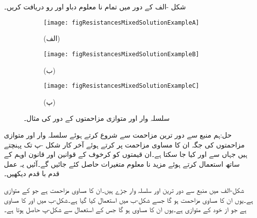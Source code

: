 شکل -الف کے دور میں تمام نا معلوم دباو اور رو دریافت کریں۔
\begin{figure}
\centering
\begin{subfigure}{\textwidth}
\centering
\texttt{[image: figResistancesMixedSolutionExampleA]}
\caption*{(الف)}
\end{subfigure}
%
\begin{subfigure}{0.6\textwidth}
\centering
\texttt{[image: figResistancesMixedSolutionExampleB]}
\caption*{(ب)}
\end{subfigure}%
\begin{subfigure}{0.4\textwidth}
\centering
\texttt{[image: figResistancesMixedSolutionExampleC]}
\caption*{(پ)}
\end{subfigure}%
\caption{سلسلہ وار اور متوازی مزاحمتوں کے دور کی مثال۔}
\label{شکل_مزاحمتی_سلسلہ_وار_متوازی_دور_حل_مثال_الف}
\end{figure}

حل:ہم منبع سے دور ترین مزاحمت سے شروع کرتے ہوئے  سلسلہ وار اور متوازی مزاحمتوں کی جگہ ان کا مساوی مزاحمت پر کرتے ہوئے آخر کار شکل -پ تک پہنچتے ہیں جہاں سے  اور  کیا جا سکتا ہے۔ان قیمتوں کو کرخوف کے قوانین اور قانون اوہم کے ساتھ استعمال کرتے ہوئے مزید نا معلوم متغیرات حاصل کئے جائیں گے۔آئیں یہ عمل قدم با قدم دیکھیں۔ 

شکل-الف میں منبع سے دور ترین  اور  سلسلہ وار جڑے ہیں۔ان کا مساوی
 مزاحمت  ہے جو  کے متوازی ہے۔یوں ان کا مساوی مزاحمت  ہو گا جسے شکل-ب میں استعمال کیا گیا ہے۔شکل-ب میں  اور  کا مساوی  ہے جو از خود  کے متوازی ہے۔یوں ان کا مساوی  ہو گا جس کے استعمال سے شکل-پ حاصل ہوتا ہے۔

